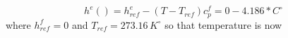 \begin{equation}
h^e() = h^e_{ref} -(T-T_{ref})c_p^f = 0 - 4.186*  C^\circ   
\end{equation}
where \(h_{ref^{ }}^f=0\) and \(T_{ref} = 273.16\, K^\circ\) so that temperature is now 